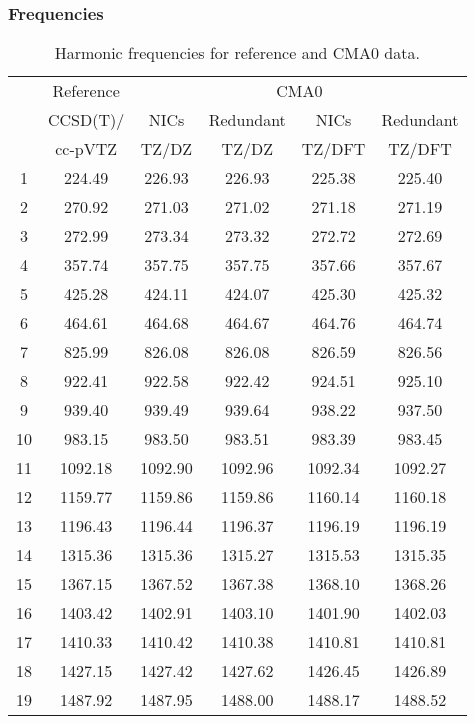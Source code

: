 \documentclass[10pt,oneside]{article}
\begin{document}
\begin{table}[h!]
\subsubsection*{Frequencies}
\centering
\caption{Harmonic frequencies for reference and CMA0 data.}
\begin{tabular}{cccccc}
\toprule
{} & Reference & \multicolumn{4}{c}{CMA0} \\
{} &  CCSD(T)/ &    NICs &  Redundant &    NICs & Redundant \\
{} &   cc-pVTZ &   TZ/DZ &      TZ/DZ &  TZ/DFT &    TZ/DFT \\
\midrule
1  &    224.49 &  226.93 &     226.93 &  225.38 &    225.40 \\
2  &    270.92 &  271.03 &     271.02 &  271.18 &    271.19 \\
3  &    272.99 &  273.34 &     273.32 &  272.72 &    272.69 \\
4  &    357.74 &  357.75 &     357.75 &  357.66 &    357.67 \\
5  &    425.28 &  424.11 &     424.07 &  425.30 &    425.32 \\
6  &    464.61 &  464.68 &     464.67 &  464.76 &    464.74 \\
7  &    825.99 &  826.08 &     826.08 &  826.59 &    826.56 \\
8  &    922.41 &  922.58 &     922.42 &  924.51 &    925.10 \\
9  &    939.40 &  939.49 &     939.64 &  938.22 &    937.50 \\
10 &    983.15 &  983.50 &     983.51 &  983.39 &    983.45 \\
11 &   1092.18 & 1092.90 &    1092.96 & 1092.34 &   1092.27 \\
12 &   1159.77 & 1159.86 &    1159.86 & 1160.14 &   1160.18 \\
13 &   1196.43 & 1196.44 &    1196.37 & 1196.19 &   1196.19 \\
14 &   1315.36 & 1315.36 &    1315.27 & 1315.53 &   1315.35 \\
15 &   1367.15 & 1367.52 &    1367.38 & 1368.10 &   1368.26 \\
16 &   1403.42 & 1402.91 &    1403.10 & 1401.90 &   1402.03 \\
17 &   1410.33 & 1410.42 &    1410.38 & 1410.81 &   1410.81 \\
18 &   1427.15 & 1427.42 &    1427.62 & 1426.45 &   1426.89 \\
19 &   1487.92 & 1487.95 &    1488.00 & 1488.17 &   1488.52 \\

\end{tabular}
\end{table}
\end{document}
